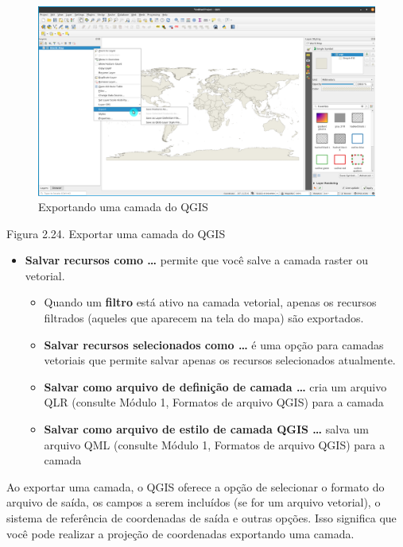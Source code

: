 \documentclass[
]{book}
\begin{document}
\begin{figure}
\centering
\includegraphics{media/modulo2/exporting-layers.png}
\caption{Exportando uma camada do QGIS}
\end{figure}

Figura 2.24. Exportar uma camada do QGIS

\begin{itemize}
\item
  \textbf{Salvar recursos como \ldots{}} permite que você salve a camada raster ou vetorial.

  \begin{itemize}
  \item
    Quando um \textbf{filtro} está ativo na camada vetorial, apenas os recursos filtrados (aqueles que aparecem na tela do mapa) são exportados.
  \item
    \textbf{Salvar recursos selecionados como \ldots{}} é uma opção para camadas vetoriais que permite salvar apenas os recursos selecionados atualmente.
  \item
    \textbf{Salvar como arquivo de definição de camada \ldots{}} cria um arquivo QLR (consulte Módulo 1, Formatos de arquivo QGIS) para a camada
  \item
    \textbf{Salvar como arquivo de estilo de camada QGIS \ldots{}} salva um arquivo QML (consulte Módulo 1, Formatos de arquivo QGIS) para a camada
  \end{itemize}
\end{itemize}

Ao exportar uma camada, o QGIS oferece a opção de selecionar o formato do arquivo de saída, os campos a serem incluídos (se for um arquivo vetorial), o sistema de referência de coordenadas de saída e outras opções. Isso significa que você pode realizar a projeção de coordenadas exportando uma camada.
\end{document}

